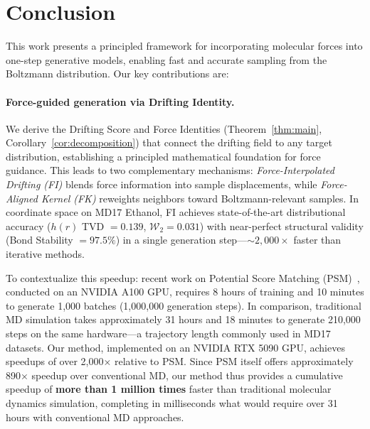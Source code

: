 \documentclass[11pt]{article}
\begin{document}
\section{Conclusion}
\label{sec:conclusion}

This work presents a principled framework for incorporating molecular forces into one-step generative models, enabling fast and accurate sampling from the Boltzmann distribution.
Our key contributions are:

\paragraph{Force-guided generation via Drifting Identity.}
We derive the Drifting Score and Force Identities (Theorem~\ref{thm:main}, Corollary~\ref{cor:decomposition}) that connect the drifting field to any target distribution, establishing a principled mathematical foundation for force guidance.
This leads to two complementary mechanisms: \emph{Force-Interpolated Drifting (FI)} blends force information into sample displacements, while \emph{Force-Aligned Kernel (FK)} reweights neighbors toward Boltzmann-relevant samples.
In coordinate space on MD17 Ethanol, FI achieves state-of-the-art distributional accuracy ($h(r)$ TVD $= 0.139$, $\mathcal{W}_2 = 0.031$) with near-perfect structural validity (Bond Stability $= 97.5\%$) in a single generation step---${\sim}2{,}000\times$ faster than iterative methods.

To contextualize this speedup: recent work on Potential Score Matching (PSM)~\citep{guo2025potential}, conducted on an NVIDIA A100 GPU, requires 8 hours of training and 10 minutes to generate 1,000 batches (1,000,000 generation steps). In comparison, traditional MD simulation takes approximately 31 hours and 18 minutes to generate 210,000 steps on the same hardware---a trajectory length commonly used in MD17 datasets. Our method, implemented on an NVIDIA RTX 5090 GPU, achieves speedups of over 2,000× relative to PSM. Since PSM itself offers approximately 890× speedup over conventional MD, our method thus provides a cumulative speedup of \textbf{more than 1 million times} faster than traditional molecular dynamics simulation, completing in milliseconds what would require over 31 hours with conventional MD approaches.
\end{document}

